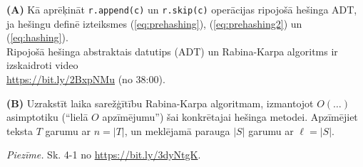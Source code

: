 \documentclass[a4paper,12pt]{article}
\begin{document}
{\bf (A)} Kā aprēķināt {\tt r.append(c)} un {\tt r.skip(c)}
operācijas ripojošā hešinga ADT, ja hešingu definē izteiksmes (\ref{eq:prehashing}), (\ref{eq:prehashing2}) un (\ref{eq:hashing}).\\
Ripojošā hešinga abstraktais datutips (ADT) un Rabina-Karpa algoritms ir izskaidroti 
video\\ \url{https://bit.ly/2BxpNMu} (no 38:00).

{\bf (B)} Uzrakstīt laika sarežģītību Rabina-Karpa algoritmam, izmantojot $O(\ldots)$ asimptotiku (``lielā $O$ apzīmējumu'')
šai konkrētajai hešinga metodei. Apzīmējiet teksta $T$ garumu ar $n = |T|$, un meklējamā parauga $|S|$ garumu ar 
$\ell = |S|$. 

\vspace{5pt}
{\small {\em Piezīme.} Sk. 4-1 no \url{https://bit.ly/3dyNtgK}.}
\end{document}
